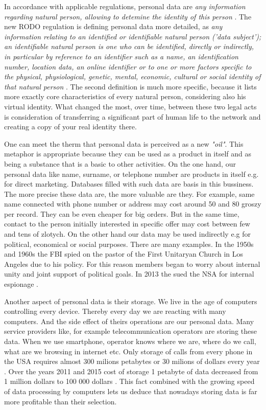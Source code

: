 \documentclass[en, noamssymb]{mgr}
\begin{document}
In accordance with applicable regulations, personal data are \textit{any information regarding natural person, allowing to detemine the identity of this person} \cite{uodo_art6}. The new RODO regulation is defining personal data more detailed, as \textit{any information relating to an identified or identifiable natural person ('data subject'); an identifiable natural person is one who can be identified, directly or indirectly, in particular by reference to an identifier such as a name, an identification number, location data, an online identifier or to one or more factors specific to the physical, physiological, genetic, mental, economic, cultural or social identity of that natural person} \cite{rodo_art4}. The second definition is much more specific, because it lists more exactly core characteristics of every natural person, considering also his virtual identity. What changed the most, over time, between these two legal acts is consideration of transferring a significant part of human life to the network and creating a copy of your real identity there.

\indent One can meet the therm that personal data is perceived as a new \textit{"oil"}. This metaphor is appropriate because they can be used as a product in itself and as being a substance that is a basic to other activities. On the one hand, our personal data like name, surname, or telephone number are products in itself e.g. for direct marketing. Databases filled with such data are basis in this bussiness. The more precise these data are, the more valuable are they. For example, same name connected with phone number or address may cost around 50 and 80 groszy per record. They can be even cheaper for big orders. But in the same time, contact to the person initially interested in specific offer may cost between few and tens of zlotych. On the other hand our data may be used indirectly e.g for political, economical or social purposes. There are many examples. In the 1950s and 1960s the FBI spied on the pastor of the First Unitaryan Church in Los Angeles due to his policy. For this reason members began to worry about internal unity and joint support of political goals. In 2013 the sued the NSA for internal espionage \cite{dane_i_goliat}.

\indent Another aspect of personal data is their storage. We live in the age of computers controlling every device. Thereby every day we are reacting with many computers. And the side effect of theirs operations are our personal data. Many service providers like, for example telecommunication operators are storing these data. When we use smartphone, operator knows where we are, where do we call, what are we browsing in internet etc. Only storage of calls from every phone in the USA requires almost 300 milions petabytes or 30 milions of dollars every year \cite{dane_i_goliat}. Over the years 2011 and 2015 cost of storage 1 petabyte of data decreased from 1 million dollars to 100 000 dollars \cite{dane_i_goliat}. This fact combined with the growing speed of data processing by computers lets us deduce that nowadays storing data is far more profitable than their selection.
\end{document}
